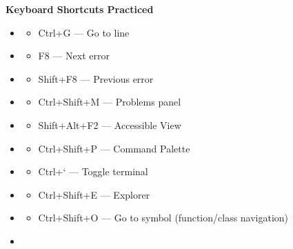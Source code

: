 \documentclass[
  justified,
  openright,
]{tufte-book}
\providecommand{\tightlist}{%
  \setlength{\itemsep}{0pt}\setlength{\parskip}{0pt}}
\begin{document}
\textbf{Keyboard Shortcuts Practiced}

\begin{itemize}
\tightlist
\item
  \begin{itemize}
  \tightlist
  \item[$\square$]
    Ctrl+G --- Go to line
  \end{itemize}
\item
  \begin{itemize}
  \tightlist
  \item[$\square$]
    F8 --- Next error
  \end{itemize}
\item
  \begin{itemize}
  \tightlist
  \item[$\square$]
    Shift+F8 --- Previous error
  \end{itemize}
\item
  \begin{itemize}
  \tightlist
  \item[$\square$]
    Ctrl+Shift+M --- Problems panel
  \end{itemize}
\item
  \begin{itemize}
  \tightlist
  \item[$\square$]
    Shift+Alt+F2 --- Accessible View
  \end{itemize}
\item
  \begin{itemize}
  \tightlist
  \item[$\square$]
    Ctrl+Shift+P --- Command Palette
  \end{itemize}
\item
  \begin{itemize}
  \tightlist
  \item[$\square$]
    Ctrl+` --- Toggle terminal
  \end{itemize}
\item
  \begin{itemize}
  \tightlist
  \item[$\square$]
    Ctrl+Shift+E --- Explorer
  \end{itemize}
\item
  \begin{itemize}
  \tightlist
  \item[$\square$]
    Ctrl+Shift+O --- Go to symbol (function/class navigation)
  \end{itemize}
\item
  \begin{itemize}

\end{itemize}
\end{itemize}
\end{document}
